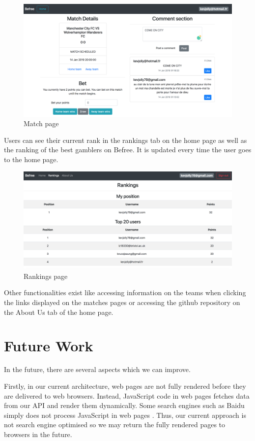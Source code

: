 \documentclass[conference]{IEEEtran}
\begin{document}
\begin{figure}[htbp]
\centerline{\includegraphics[scale=0.2]{match_page.png}}
\caption{Match page}
\end{figure}

Users can see their current rank in the rankings tab on the home page as well as the ranking of the best gamblers on Befree. It is updated every time the user goes to the home page.

\begin{figure}[htbp]
\centerline{\includegraphics[scale=0.2]{rankings.png}}
\caption{Rankings page}
\end{figure}

Other functionalities exist like accessing information on the teams when clicking the links displayed on the matches pages or accessing the github repository on the About Us tab of the home page.

\section{Future Work}
In the future, there are several aspects which we can improve.

Firstly, in our current architecture, web pages are not fully rendered before they are delivered to web browsers. Instead, JavaScript code in web pages fetches data from our API and render them dynamically. Some search engines such as Baidu simply does not process JavaScript in web pages \cite{index-js}. Thus, our current approach is not search engine optimised so we may return the fully rendered pages to browsers in the future.
\end{document}
